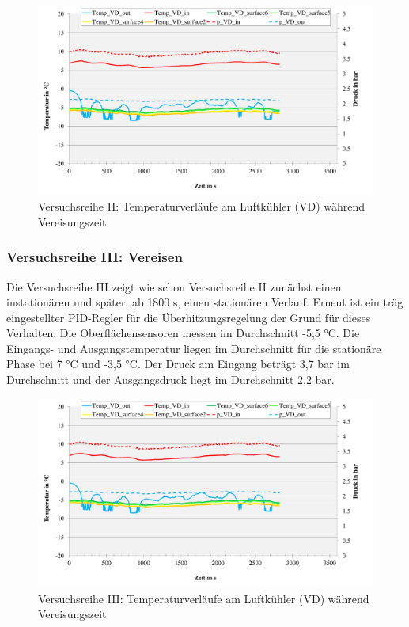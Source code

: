 \begin{figure}[htb]
\centering		\includegraphics[page=2,width=1.08\textwidth]{Pictures/Inbetriebnahme/Abtaumethoden_Tempverlaufe_Vereisen.pdf}
\caption{Versuchsreihe II: Temperaturverläufe am Luftkühler (VD) während Vereisungszeit}
\label{fig:VereisenII}
\end{figure}


\subsubsection*{Versuchsreihe III: Vereisen}

Die Versuchsreihe III zeigt wie schon Versuchsreihe II zunächst einen instationären und später, ab 1800 s, einen stationären Verlauf. Erneut ist ein träg eingestellter PID-Regler für die Überhitzungsregelung der Grund für dieses Verhalten. Die Oberflächensensoren messen im Durchschnitt -5,5 °C. Die Eingangs- und Ausgangstemperatur liegen im Durchschnitt für die stationäre Phase bei 7 °C und -3,5 °C. Der Druck am Eingang beträgt 3,7 bar im Durchschnitt und der Ausgangsdruck liegt im Durchschnitt 2,2 bar.  


\begin{figure}[htb]
\centering		\includegraphics[page=3,width=1.08\textwidth]{Pictures/Inbetriebnahme/Abtaumethoden_Tempverlaufe_Vereisen.pdf}
\caption{Versuchsreihe III: Temperaturverläufe am Luftkühler (VD) während Vereisungszeit}
\label{fig:VereisenIII}
\end{figure}


